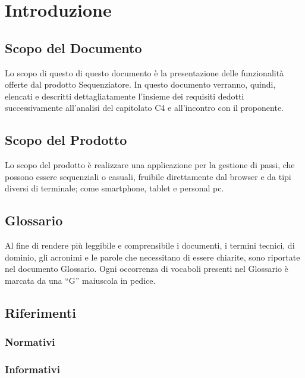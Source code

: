 \section{Introduzione}
\subsection{Scopo del Documento}
Lo scopo di questo di questo documento è la presentazione delle funzionalità offerte dal prodotto Sequenziatore. In questo documento verranno, quindi, elencati e descritti dettagliatamente l'insieme dei requisiti dedotti successivamente all'analisi del capitolato C4 e all'incontro con il proponente.
\subsection{Scopo del Prodotto}
Lo scopo del prodotto è realizzare una applicazione per la gestione di passi, che possono essere sequenziali o casuali, fruibile direttamente dal browser e da tipi diversi di terminale; come smartphone, tablet e personal pc.
\subsection{Glossario}
Al fine di rendere più leggibile e comprensibile i documenti, i termini tecnici, di dominio, gli acronimi e le parole che necessitano di
essere chiarite, sono riportate nel documento Glossario.
Ogni occorrenza di vocaboli presenti nel Glossario è marcata da una “G” maiuscola in
pedice.
\subsection{Riferimenti}
\subsubsection{Normativi}
\subsubsection{Informativi}